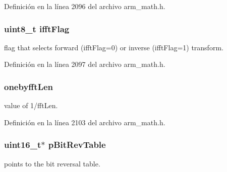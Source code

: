 Definición en la línea 2096 del archivo arm\+\_\+math.\+h.

\subsubsection[{\texorpdfstring{ifft\+Flag}{ifftFlag}}]{\setlength{\rightskip}{0pt plus 5cm}uint8\+\_\+t ifft\+Flag}\hypertarget{structarm__cfft__radix4__instance__f32_ad6ca6e223f986ebfd94c5ee1e410aa73}{}\label{structarm__cfft__radix4__instance__f32_ad6ca6e223f986ebfd94c5ee1e410aa73}
flag that selects forward (ifft\+Flag=0) or inverse (ifft\+Flag=1) transform. 

Definición en la línea 2097 del archivo arm\+\_\+math.\+h.

\subsubsection[{\texorpdfstring{onebyfft\+Len}{onebyfftLen}}]{ onebyfft\+Len}\hypertarget{structarm__cfft__radix4__instance__f32_acf295a7b97b7d48a9cae4d1ab5ed00f6}{}\label{structarm__cfft__radix4__instance__f32_acf295a7b97b7d48a9cae4d1ab5ed00f6}
value of 1/fft\+Len. 

Definición en la línea 2103 del archivo arm\+\_\+math.\+h.

\subsubsection[{\texorpdfstring{p\+Bit\+Rev\+Table}{pBitRevTable}}]{\setlength{\rightskip}{0pt plus 5cm}uint16\+\_\+t$\ast$ p\+Bit\+Rev\+Table}\hypertarget{structarm__cfft__radix4__instance__f32_a46a2fb328199897af100fea0bfdf59aa}{}\label{structarm__cfft__radix4__instance__f32_a46a2fb328199897af100fea0bfdf59aa}
points to the bit reversal table. 

